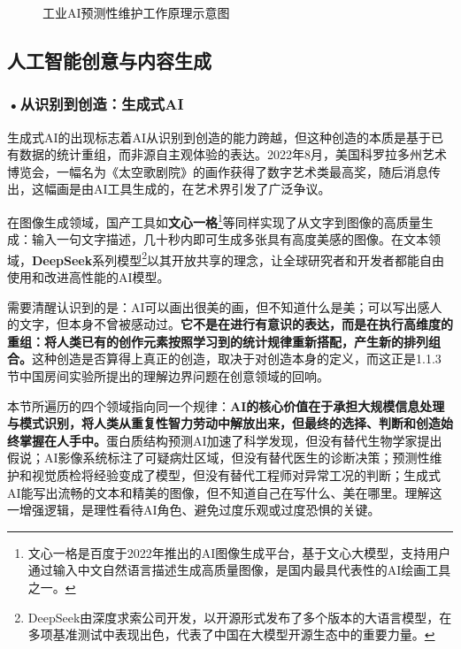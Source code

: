 \begin{figure}[htbp]
\centering
{}
\caption{工业AI预测性维护工作原理示意图}
\label{fig:ch1_11}
\end{figure}

\subsection{人工智能创意与内容生成}

\subsubsection*{\textbf{•从识别到创造：生成式AI}}

生成式AI的出现标志着AI从识别到创造的能力跨越，但这种创造的本质是基于已有数据的统计重组，而非源自主观体验的表达。2022年8月，美国科罗拉多州艺术博览会，一幅名为《太空歌剧院》的画作获得了数字艺术类最高奖，随后消息传出，这幅画是由AI工具生成的，在艺术界引发了广泛争议。

在图像生成领域，国产工具如\textbf{文心一格}\footnote{文心一格是百度于2022年推出的AI图像生成平台，基于文心大模型，支持用户通过输入中文自然语言描述生成高质量图像，是国内最具代表性的AI绘画工具之一。}等同样实现了从文字到图像的高质量生成：输入一句文字描述，几十秒内即可生成多张具有高度美感的图像。在文本领域，\textbf{DeepSeek}系列模型\footnote{DeepSeek由深度求索公司开发，以开源形式发布了多个版本的大语言模型，在多项基准测试中表现出色，代表了中国在大模型开源生态中的重要力量。}以其开放共享的理念，让全球研究者和开发者都能自由使用和改进高性能的AI模型。

需要清醒认识到的是：AI可以画出很美的画，但不知道什么是美；可以写出感人的文字，但本身不曾被感动过。\textbf{它不是在进行有意识的表达，而是在执行高维度的重组：将人类已有的创作元素按照学习到的统计规律重新搭配，产生新的排列组合。}这种创造是否算得上真正的创造，取决于对创造本身的定义，而这正是1.1.3节中国房间实验所提出的理解边界问题在创意领域的回响。

本节所遍历的四个领域指向同一个规律：\textbf{AI的核心价值在于承担大规模信息处理与模式识别，将人类从重复性智力劳动中解放出来，但最终的选择、判断和创造始终掌握在人手中。}蛋白质结构预测AI加速了科学发现，但没有替代生物学家提出假说；AI影像系统标注了可疑病灶区域，但没有替代医生的诊断决策；预测性维护和视觉质检将经验变成了模型，但没有替代工程师对异常工况的判断；生成式AI能写出流畅的文本和精美的图像，但不知道自己在写什么、美在哪里。理解这一增强逻辑，是理性看待AI角色、避免过度乐观或过度恐惧的关键。

